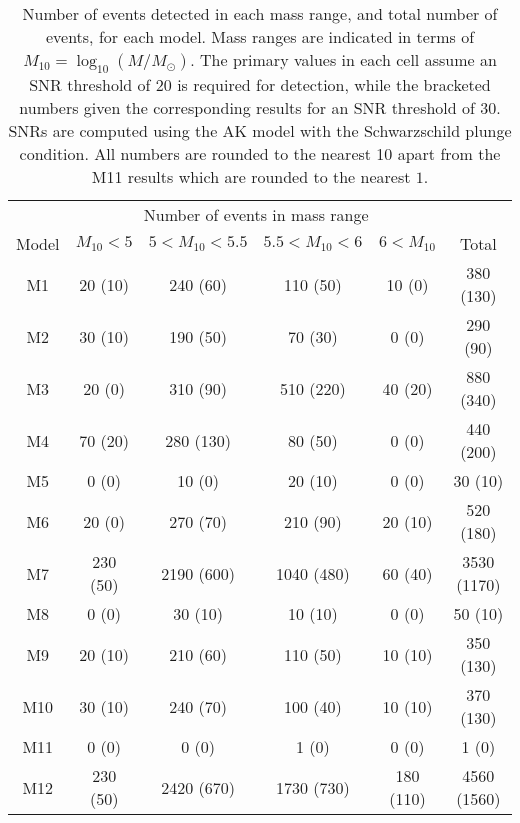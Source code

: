 \documentclass[a4paper]{jpconf}
\begin{document}
\begin{table}
\begin{center}
\begin{tabular}{c|c|c|c|c|c|}
&\multicolumn{4}{|c|}{Number of events in mass range}&\\
Model&$M_{10}< 5$&$5 < M_{10} < 5.5$&$5.5 < M_{10} < 6$&$6 < M_{10}$&Total\\\hline
M1&20 (10)&240 (60)&110 (50)&10 (0)&380 (130)\\
M2&30 (10)&190 (50)&70 (30)&0 (0)&290 (90)\\
M3&20 (0)&310 (90)&510 (220)&40 (20)&880 (340)\\
M4&70 (20)&280 (130)&80 (50)&0 (0)&440 (200)\\
M5&0 (0)&10 (0)&20 (10)&0 (0)&30 (10)\\
M6&20 (0)&270 (70)&210 (90)&20 (10)&520 (180)\\
M7&230 (50)&2190 (600)&1040 (480)&60 (40)&3530 (1170)\\
M8&0 (0)&30 (10)&10 (10)&0 (0)&50 (10)\\
M9&20 (10)&210 (60)&110 (50)&10 (10)&350 (130)\\
M10&30 (10)&240 (70)&100 (40)&10 (10)&370 (130)\\
M11&0 (0)&0 (0)&1 (0)&0 (0)&1 (0)\\
M12&230 (50)&2420 (670)&1730 (730)&180 (110)&4560 (1560)\\
\end{tabular}
\end{center}
\caption{\label{tab:AKrates}Number of events detected in each mass range, and total number of events, for each model. Mass ranges are indicated in terms of $M_{10}=\log_{10}(M/M_\odot)$. The primary values in each cell assume an SNR threshold of $20$ is required for detection, while the bracketed numbers given the corresponding results for an SNR threshold of $30$. SNRs are computed using the AK model with the Schwarzschild plunge condition. All numbers are rounded to the nearest 10 apart from the M11 results which are rounded to the nearest $1$.}
\end{table}
\end{document}
